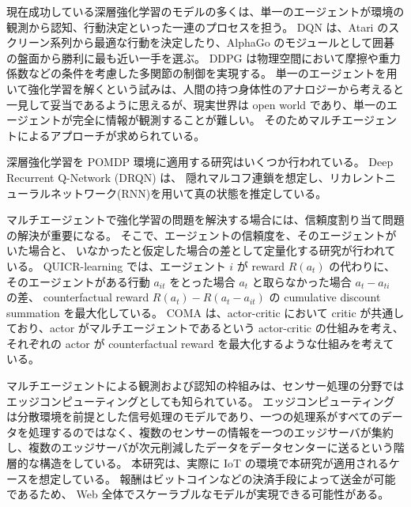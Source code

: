 
\iffalse
現在成功している深層強化学習のモデルの多くは、単一のエージェントが環境の観測から認知、行動決定といった一連のプロセスを担う。
DQN \citep{mnih2015human,silver2016mastering} は、Atari のスクリーン系列から最適な行動を決定したり、AlphaGo のモジュールとして囲碁の盤面から勝利に最も近い一手を選ぶ。
DDPG \citep{lillicrap2015continuous} は物理空間において摩擦や重力係数などの条件を考慮した多関節の制御を実現する。
単一のエージェントを用いて強化学習を解くという試みは、人間の持つ身体性のアナロジーから考えると一見して妥当であるように思えるが、現実世界は open world であり、単一のエージェントが完全に情報が観測することが難しい。
そのためマルチエージェントによるアプローチが求められている。

深層強化学習を POMDP 環境に適用する研究はいくつか行われている。
Deep Recurrent Q-Network (DRQN) \citep{sorokin2015deep} は、
隠れマルコフ連鎖を想定し、リカレントニューラルネットワーク(RNN)を用いて真の状態を推定している。



マルチエージェントで強化学習の問題を解決する場合には、信頼度割り当て問題の解決が重要になる。
そこで、エージェントの信頼度を、そのエージェントがいた場合と、
いなかったと仮定した場合の差として定量化する研究が行われている。
QUICR-learning \citep{agogino2006quicr} では、エージェント $i$ が reward $R(a_t)$ の代わりに、
そのエージェントがある行動 $a_{it}$ をとった場合 $a_t$ と取らなかった場合 $a_t-a_{ti}$ の差、
counterfactual reward $R(a_t) - R(a_t - a_{it})$ の cumulative discount summation を最大化している。
COMA \citep{foerster2017counterfactual} は、actor-critic において critic が共通しており、actor がマルチエージェントであるという actor-critic の仕組みを考え、それぞれの actor が counterfactual reward を最大化するような仕組みを考えている。

マルチエージェントによる観測および認知の枠組みは、センサー処理の分野ではエッジコンピューティング\citep{bonomi2012fog}としても知られている。
エッジコンピューティングは分散環境を前提とした信号処理のモデルであり、一つの処理系がすべてのデータを処理するのではなく、複数のセンサーの情報を一つのエッジサーバが集約し、複数のエッジサーバが次元削減したデータをデータセンターに送るという階層的な構造をしている。
本研究は、実際に IoT の環境で本研究が適用されるケースを想定している。
報酬はビットコインなどの決済手段によって送金が可能であるため、
Web 全体でスケーラブルなモデルが実現できる可能性がある。

